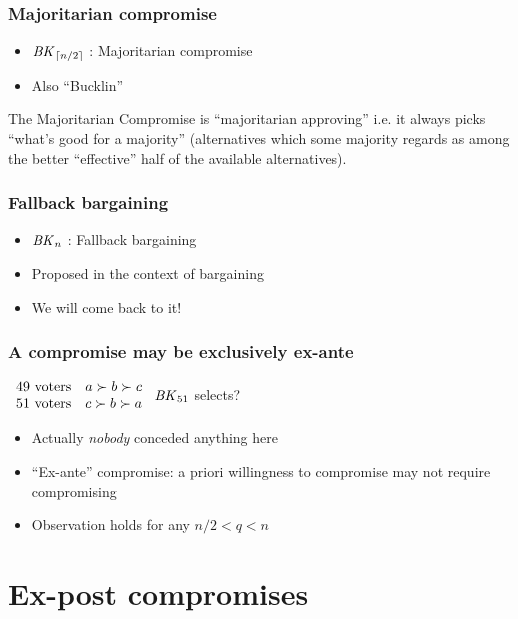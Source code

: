 \documentclass[french, english]{beamer}
\begin{document}
\begin{frame}
	\frametitle{Majoritarian compromise}
	\begin{itemize}
		\item $\BK[\ceil{n / 2}]$ : Majoritarian compromise \citep{Sertel1999}
		\item Also “Bucklin” \citep{Erdelyi2015}
	\end{itemize}
	\begin{block}{\citet[abstract]{Sertel1999}}
		\og{}The Majoritarian Compromise is “majoritarian approving” i.e. it always picks “what’s good for a majority” (alternatives which some majority regards as among the better “effective” half of the available alternatives).\fg{}
	\end{block}
\end{frame}

\begin{frame}
	\frametitle{Fallback bargaining}
	\begin{itemize}
		\item $\BK[n]$ : Fallback bargaining
		\item Proposed in the context of bargaining
		\item We will come back to it!
	\end{itemize}
\end{frame}

\begin{frame}
	\frametitle{A compromise may be exclusively ex-ante}
	\begin{example}[{$\BK[51]$}]
		$\begin{array}{rl}
			49\text{ voters} & a \pref b \pref c\\%
			51\text{ voters} & c \pref b \pref a\\%
		\end{array}$
		\hspace{2cm} $\BK[51]$ selects? \onslide<2>{$\set{c}$ ($\rho_3 = 1$)}
	\end{example}
	\begin{itemize}
		\item Actually \emph{nobody} conceded anything here
		\item “Ex-ante” compromise: a priori willingness to compromise may not require compromising
		\item Observation holds for any $n / 2 < q < n$
	\end{itemize}
\end{frame}

\section{Ex-post compromises}
\end{document}
